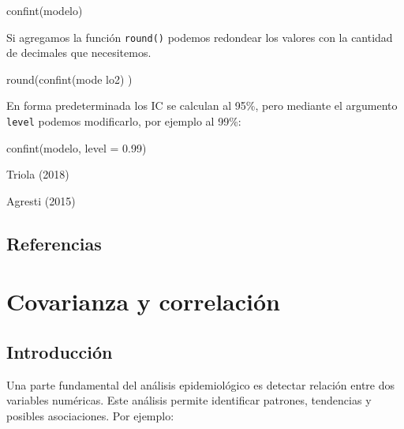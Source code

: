 \documentclass[
  spanish,
  a4paper,
]{scrbook}
\newenvironment{Shaded}{\begin{snugshade}}{\end{snugshade}}
\newcommand{\AttributeTok}[1]{\textcolor[rgb]{0.40,0.45,0.13}{#1}}
\newcommand{\FloatTok}[1]{\textcolor[rgb]{0.68,0.00,0.00}{#1}}
\newcommand{\FunctionTok}[1]{\textcolor[rgb]{0.28,0.35,0.67}{#1}}
\newcommand{\NormalTok}[1]{\textcolor[rgb]{0.00,0.23,0.31}{#1}}
\begin{document}
\begin{itemize}
\begin{Shaded}
\begin{Highlighting}[]
\FunctionTok{confint}\NormalTok{(modelo)}
\end{Highlighting}
\end{Shaded}

  Si agregamos la función \texttt{round()} podemos redondear los valores
  con la cantidad de decimales que necesitemos.

\begin{Shaded}
\begin{Highlighting}[]
\FunctionTok{round}\NormalTok{(}\FunctionTok{confint}\NormalTok{(mode lo2) ) }
\end{Highlighting}
\end{Shaded}

  En forma predeterminada los IC se calculan al 95\%, pero mediante el
  argumento \texttt{level} podemos modificarlo, por ejemplo al 99\%:

\begin{Shaded}
\begin{Highlighting}[]
\FunctionTok{confint}\NormalTok{(modelo, }\AttributeTok{level =} \FloatTok{0.99}\NormalTok{)}
\end{Highlighting}
\end{Shaded}
\end{itemize}

Triola (2018)

Agresti (2015)

\section*{Referencias}\label{referencias-12}


\chapter{Covarianza y correlación}\label{covarianza-y-correlaciuxf3n}

\section{Introducción}\label{introducciuxf3n-12}

Una parte fundamental del análisis epidemiológico es detectar relación
entre dos variables numéricas. Este análisis permite identificar
patrones, tendencias y posibles asociaciones. Por ejemplo:
\end{document}
